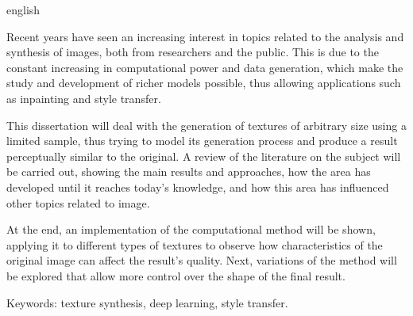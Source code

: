 \begin{resumo}[Abstract]
 \begin{otherlanguage*}{english}

Recent years have seen an increasing interest in topics related to the analysis and synthesis of images, both from researchers and the public. This is due to the constant increasing in computational power and data generation, which make the study and development of richer models possible,
thus allowing applications such as inpainting and style transfer.

This dissertation will deal with the generation of textures of arbitrary size using a limited sample, thus trying to model its generation process and produce a result perceptually similar to the original. A review of the literature on the subject will be carried out, showing the main results and approaches, how the area has developed until it reaches today's knowledge, and how this area has influenced other topics related to image.

At the end, an implementation of the computational method will be shown, applying it to different types of textures to observe how characteristics of the original image can affect the result's quality. Next, variations of the method will be explored that allow more control over the shape of the final result.

 \end{otherlanguage*}

 Keywords: texture synthesis, deep learning, style transfer.
\end{resumo}